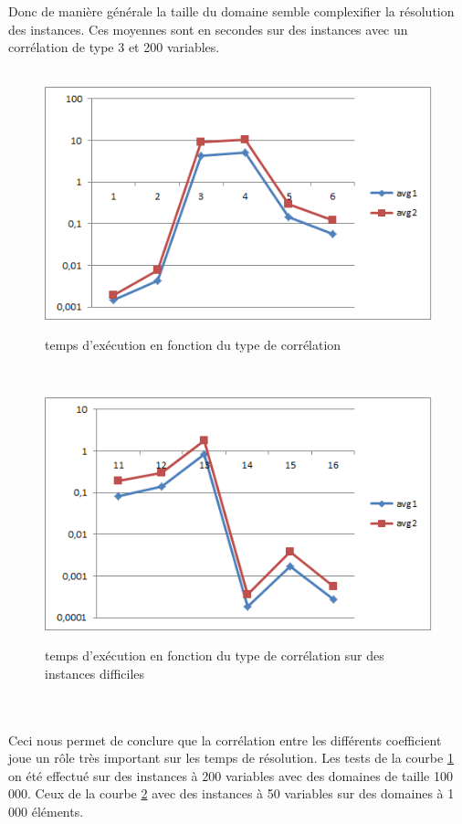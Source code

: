 \documentclass[12pt,a4paper]{article}
\begin{document}
Donc de manière générale la taille du domaine semble complexifier la résolution des instances. Ces moyennes sont en secondes sur des instances avec un corrélation de type 3 et 200 variables.\\

~\\
\begin{figure}[h]
	\centering
	\includegraphics{./resultat/graphe_temps_selon_corelation_(coef_range_100000).png}
	\label{fonctcore}
	\caption{temps d’exécution en fonction du type de corrélation}
\end{figure}
~\\
\begin{figure}[h]
	\centering
	\includegraphics{./resultat/analyse_instances_hard_temps_selon_type(50_variables).png}
	\label{hard}
	\caption{temps d’exécution en fonction du type de corrélation sur des instances difficiles}
\end{figure}
~\\
~\\

Ceci nous permet de conclure que la corrélation entre les différents coefficient joue un rôle très important sur les temps de résolution. Les tests de la courbe \ref{fonctcore} on été effectué sur des instances à 200 variables avec des domaines de taille 100 000. Ceux de la courbe \ref{hard} avec des instances à 50 variables sur des domaines à 1 000 éléments.\\
\end{document}

